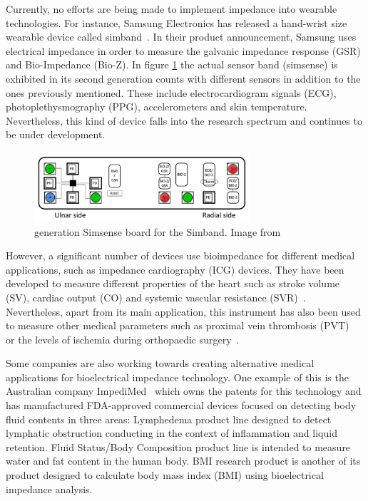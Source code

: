 Currently, no efforts are being made to implement impedance into wearable technologies. For instance, Samsung Electronics has released a hand-wrist size wearable device called simband~\cite{simsense}. In their product announcement, Samsung uses electrical impedance in order to measure the galvanic impedance response (GSR) and Bio-Impedance (Bio-Z). In figure \ref{fig:simsense} the actual sensor band (simsense) is exhibited in its second generation counts with different sensors in addition to the ones previously mentioned. These include electrocardiogram signals (ECG), photoplethysmography (PPG), accelerometers and skin temperature. Nevertheless, this kind of device falls into the research spectrum and continues to be under development.

\begin{figure}[!htpb]
	\centering
	\includegraphics[width=8cm,keepaspectratio]{figure10}    
	\caption[ generation Simsense board for the Simband]{ generation Simsense board for the Simband. Image from \cite{simsense}}
	\label{fig:simsense}
\end{figure}

However, a significant number of devices use bioimpedance for different medical applications, such as impedance cardiography (ICG) devices. They have been developed to measure different properties of the heart such as stroke volume (SV), cardiac output (CO) and systemic vascular resistance (SVR)~\cite{neath2005utility}.  Nevertheless, apart from its main application, this instrument has also been used to measure other medical parameters such as proximal vein thrombosis (PVT)~\cite{hull1978impedance} or the levels of ischemia during orthopaedic surgery~\cite{distefano1973bioelectrical}.

Some companies are also working towards creating alternative medical applications for bioelectrical impedance technology. One example of this is the Australian company ImpediMed~\cite{impedimed} which owns the patents for this technology and has manufactured FDA-approved commercial devices focused on detecting body fluid contents in three areas: Lymphedema product line designed to detect lymphatic obstruction conducting in the context of inflammation and liquid retention.  Fluid Status/Body Composition product line is intended to measure water and fat content in the human body. BMI research product is another of its product designed to calculate body mass index (BMI) using bioelectrical impedance analysis.

